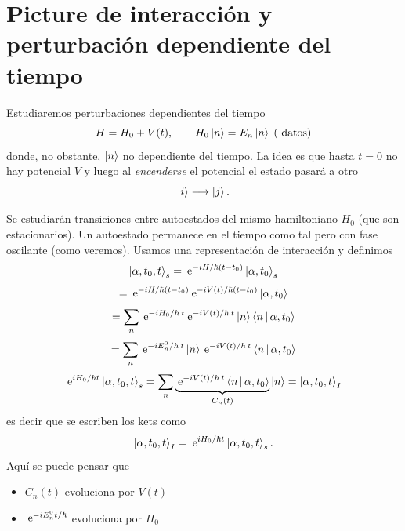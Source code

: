 \documentclass[10pt,oneside]{CBFT_book}
\begin{document}
\chapter{Picture de interacción y perturbación dependiente del tiempo}

Estudiaremos perturbaciones dependientes del tiempo 
\[
	H = H_0 + V(t), \qquad H_0 \Ket{n} = E_n \Ket{n} \; (\text{ datos})
\]
donde, no obstante, $\Ket{n}$ no dependiente del tiempo. 
La idea es que hasta $t=0$ no hay potencial $V$ y luego al {\it encenderse} el potencial el estado pasará
a otro
\[
	\Ket{i} \longrightarrow \Ket{j}.
\]

Se estudiarán transiciones entre autoestados del mismo hamiltoniano $H_0$ (que son estacionarios). 
Un autoestado permanece en el tiempo como tal pero con fase oscilante (como veremos).
Usamos una representación de interacción y definimos
\[
	\Ket{\alpha,t_0,t}_s = \:\mathrm{e}^{-iH/\hbar(t-t_0)}\Ket{\alpha,t_0}_s
\]
\[
	= \:\mathrm{e}^{-iH/\hbar(t-t_0)} \:\mathrm{e}^{-iV(t)/\hbar(t-t_0)} \Ket{\alpha,t_0}
\]
\[
	= \sum_n \:\mathrm{e}^{-iH_0/\hbar \: t} \:\mathrm{e}^{-iV(t)/\hbar \: t} \ket{n}\Braket{n|\alpha,t_0}
\]
\[
	= \sum_n \:\mathrm{e}^{-iE_n^0/\hbar \: t }\ket{n}\:\mathrm{e}^{-iV(t)/\hbar \: t } \Braket{n|\alpha,t_0}	
\]
\[
	\:\mathrm{e}^{iH_0/\hbar t}\Ket{\alpha,t_0,t}_s =
	\sum_n  \underbrace{\:\mathrm{e}^{-iV(t)/\hbar \: t} \Braket{n|\alpha,t_0}}_{C_n(t)} \ket{n} = \Ket{\alpha,t_0,t}_I	
\]
es decir que se escriben los kets como
\[
	 \Ket{\alpha,t_0,t}_I = \:\mathrm{e}^{iH_0/\hbar t}\Ket{\alpha,t_0,t}_s.
\]
Aquí se puede pensar que 
\begin{itemize}
 \item $C_n(t)$ evoluciona por $V(t)$
 \item $\:\mathrm{e}^{-iE_n^0 t/\hbar}$ evoluciona por $H_0$
\end{itemize}
\end{document}

